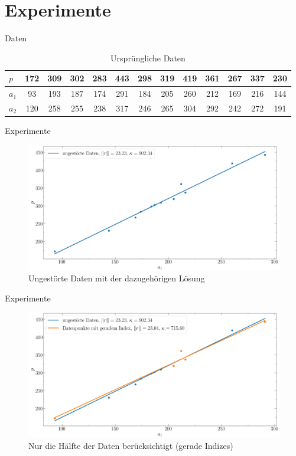 \documentclass{beamer}
\begin{document}
\section{Experimente}

\begin{frame}{Daten}
	\begin{table}\small
		\begin{tabular}{l || c c c c c c c c c c c c}
			$p$ & 172 & 309 & 302 & 283 & 443 & 298 & 319 & 419 & 361 & 267 & 337 & 230\\
			\hline
			$a_1$ & 93 & 193 & 187 & 174 & 291 & 184 & 205 & 260 &212 & 169 & 216 & 144\\
			\hline
			$a_2$ & 120 & 258 & 255 & 238 & 317 & 246 & 265 & 304 & 292 & 242 & 272 & 191\\
		\end{tabular}
		\caption{Ursprüngliche Daten}
	\end{table}
\end{frame}

\begin{frame}{Experimente}
	\begin{figure}
		\includegraphics[width=\textwidth]{Bilder/ungest.png}
		\caption{Ungestörte Daten mit der dazugehörigen Lösung}
	\end{figure}
\end{frame}

\begin{frame}{Experimente}
	\begin{figure}
		\includegraphics[width=\textwidth]{Bilder/ungest+gerad.png}
		\caption{Nur die Hälfte der Daten berücksichtigt (gerade Indizes)}
	\end{figure}
 \end{frame}
\end{document}
